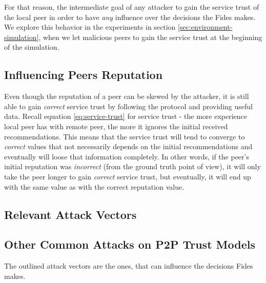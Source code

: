 For that reason, the intermediate goal of any attacker to gain the service trust of the local peer in order to have \textit{any} influence over the decisions the Fides makes.
We explore this behavior in the experiments in section \ref{sec:environment-simulation}, when we let malicious peers to gain the service trust at the beginning of the simulation.

\subsection{Influencing Peers Reputation}
\label{subsec:influencing-peers-reputation}


Even though the reputation of a peer can be skewed by the attacker, it is still able to gain \textit{correct} service trust by following the protocol and providing useful data.
Recall equation \ref{eq:service-trust} for service trust - the more experience local peer has with remote peer, the more it ignores the initial received recommendations.
This means that the service trust will tend to converge to \textit{correct} values that not necessarily depends on the initial recommendations and eventually will loose that information completely.
In other words, if the peer's initial reputation was \textit{incorrect} (from the ground truth point of view), it will only take the peer longer to gain \textit{correct} service trust, but eventually, it will end up with the same value as with the correct reputation value.


\subsection{Relevant Attack Vectors}
\label{subsec:relevant-attack-vectors}


\subsection{Other Common Attacks on P2P Trust Models}
\label{subsec:other-common-attacks}

The outlined attack vectors are the ones, that can influence the decisions Fides makes.
